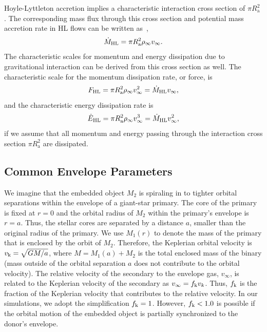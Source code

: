 Hoyle-Lyttleton accretion implies a characteristic interaction cross section of $\pi R_{\mathrm{a}}^2$ \cite{1939PCPS...35..405H}.
The corresponding mass flux through this cross section and potential mass accretion rate in HL flows can be written as~\cite{Edgar:2004},
\begin{equation}\label{eq:mdotHL}
\dot M_{\rm HL} = \pi R_{\mathrm{a}}^2 \rho_\infty v_\infty. 
\end{equation}
The characteristic scales for momentum and energy dissipation due to gravitational interaction \cite{1999ApJ...513..252O} can be derived from this cross section as well. The characteristic scale for the momentum dissipation rate, or force, is
\begin{equation}\label{eq:fHL}
    F_{\rm HL} = \pi R_{\mathrm{a}}^2 \rho_\infty v_\infty^2 = \dot M_{\rm HL} v_\infty, 
\end{equation}
and the characteristic energy dissipation rate is
\begin{equation}
    \dot E_{\rm HL} = \pi R_{\mathrm{a}}^2 \rho_\infty v_\infty^3 = \dot M_{\rm HL} v_\infty^2, 
\end{equation}
if we assume that all momentum and energy passing through the interaction cross section $\pi R_{\mathrm{a}}^2$ are dissipated. 

\subsection{Common Envelope Parameters}

We imagine that the embedded object $M_2$ is spiraling in to tighter orbital separations within the envelope of a giant-star primary.  The core of the primary is fixed at $r = 0$ and the orbital radius of $M_2$ within  the primary's envelope is $r = a$. Thus, the stellar cores are separated by a distance $a$, smaller than the original radius of the primary.  We use $M_1(r)$ to denote the mass of the primary that is enclosed by the orbit of $M_2$. Therefore, the Keplerian orbital velocity is $v_{\rm k} = \sqrt{GM/a}$,
where $M = M_{1}(a) + M_{2}$ is the total enclosed mass of the binary (mass outside of the orbital separation $a$ does not contribute to the orbital velocity). The relative velocity of the secondary to the envelope gas, $v_{\infty}$, is related to the Keplerian velocity of the secondary as $v_{\infty} = f_{\rm k}v_{k}$. Thus, $f_{\rm k}$ is the fraction of the Keplerian velocity that contributes to the relative velocity. In our simulations, we adopt the simplification $f_{\rm k} = 1$. However, $f_{\rm k} < 1.0$ is possible if the orbital motion of the embedded object is partially synchronized to the donor's envelope.

